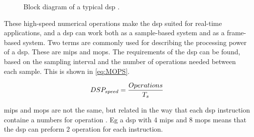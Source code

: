 \begin{figure}
\centering
\def\svgwidth{\columnwidth}

\caption{Block diagram of a typical \gls{dsp} \cite{AnalogDialogue}.}
		\label{fig:typ_dsp}
\end{figure}

These high-speed numerical operations make the \gls{dsp} suited for real-time applications, and a \gls{dsp} can work both as a sample-based system and as a frame-based system. 
Two terms are commonly used for describing the processing power of a \gls{dsp}. These are \gls{mips} and \gls{mops}. The requirements of the \gls{dsp} can be found, based on the sampling interval and the number of operations needed between each sample. This is shown in \eqref{eq:MOPS}.

\begin{equation}\label{eq:MOPS}
        DSP_{speed} = \frac{Operations}{T_s}\addunit{MOPS}
    \end{equation}

    \startexplain
    \stopexplain


\gls{mips} and \gls{mops} are not the same, but related in the way that each \gls{dsp} instruction containe a numbers for operation  \cite{AnalogDialogue}. Eg a \gls{dsp} with 4 \gls{mips} and 8 \gls{mops} means that the \gls{dsp} can preform 2 operation for each instruction.


